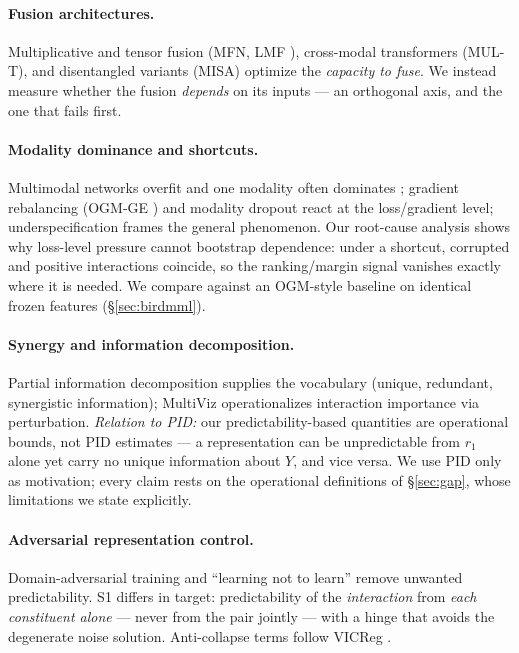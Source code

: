 \documentclass[10pt,twocolumn,letterpaper]{article}
\newcommand{\ro}{r_1}
\begin{document}
\paragraph{Fusion architectures.}
Multiplicative and tensor fusion (MFN, LMF \cite{lmf}), cross-modal transformers (MUL-T), and
disentangled variants (MISA) optimize the \emph{capacity to fuse}. We instead measure whether the
fusion \emph{depends} on its inputs --- an orthogonal axis, and the one that fails first.

\paragraph{Modality dominance and shortcuts.}
Multimodal networks overfit and one modality often dominates \cite{wang2020}; gradient
rebalancing (OGM-GE \cite{ogm}) and modality dropout react at the loss/gradient level;
underspecification \cite{underspec} frames the general phenomenon. Our root-cause analysis shows
why loss-level pressure cannot bootstrap dependence: under a shortcut, corrupted and positive
interactions coincide, so the ranking/margin signal vanishes exactly where it is needed. We
compare against an OGM-style baseline on identical frozen features (\S\ref{sec:birdmml}).

\paragraph{Synergy and information decomposition.}
Partial information decomposition \cite{pid} supplies the vocabulary (unique, redundant,
synergistic information); MultiViz \cite{multiviz} operationalizes interaction importance via
perturbation. \emph{Relation to PID:} our predictability-based quantities are operational bounds,
not PID estimates --- a representation can be unpredictable from $\ro$ alone yet carry no
unique information about $Y$, and vice versa. We use PID only as motivation; every claim rests on
the operational definitions of \S\ref{sec:gap}, whose limitations we state explicitly.

\paragraph{Adversarial representation control.}
Domain-adversarial training \cite{dann} and ``learning not to learn'' \cite{learningnottoplearn}
remove unwanted predictability. S1 differs in target: predictability of the \emph{interaction}
from \emph{each constituent alone} --- never from the pair jointly --- with a hinge that avoids
the degenerate noise solution. Anti-collapse terms follow VICReg \cite{vicreg}.
\end{document}
